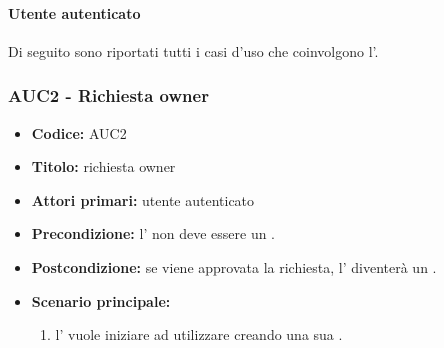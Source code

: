 \documentclass[casi-duso]{subfiles}
\begin{document}
\paragraph{Utente autenticato}
\label{par:utente-autenticato}
Di seguito sono riportati tutti i casi d'uso che coinvolgono l'.

\subsubsection{AUC2 - Richiesta owner}
\label{subsub:AUC2}
\begin{itemize}
  \item \textbf{Codice:} AUC2
  \item \textbf{Titolo:} richiesta owner
  \item \textbf{Attori primari:} utente autenticato
  \item \textbf{Precondizione:} l' non deve essere un .
  \item \textbf{Postcondizione:} se viene approvata la richiesta, l' diventerà un .
  \item \textbf{Scenario principale:} 
  \begin{enumerate}
    \item l' vuole iniziare ad utilizzare  creando una sua .
  \end{enumerate}
\end{itemize}
\end{document}
